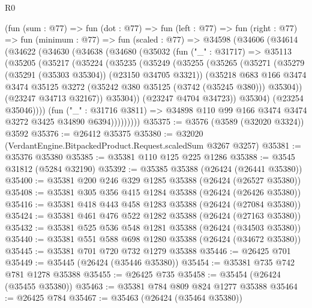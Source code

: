 \begin{lexlean}{R0}
\begin{coremodule}
    (fun (sum : @77) =>
    fun (dot : @77) =>
    fun (left : @77) =>
    fun (right : @77) =>
    fun (minimum : @77) =>
    fun (scaled : @77) =>
    @34598
      (@34606
        (@34614
          (@34622
            (@34630
              (@34638
                (@34680
                  (@35032
                    (fun ("_" : @31717) =>
                    @35113
                      (@35205
                        (@35217
                          (@35224
                            (@35235
                              (@35249
                                (@35255
                                  (@35265
                                    (@35271
                                      (@35279 (@35291 (@35303 @35304)) (@23150 @34705 @3321))
                                      (@35218
                                        @683
                                        @166
                                        @3474
                                        @3474
                                        @35125
                                        @3272
                                        (@35242 @380 @35125 (@3742 (@35245 @380)))
                                        @35304))
                                    (@23247 @34713 @32167))
                                  @35304))
                              (@23247 @4704 @34723))
                            @35304)
                          (@23254 @35046))))
                    (fun ("_" : @31716 @3811) =>
                    @34898 @110 @99 @166 @3474 @3474 @3272 @3425 @34890 @6394)))))))))
@35375 := @3576 (@3589 (@32020 @3324)) @3592
@35376 := @26412 @35375
@35380 := @32020 (VerdantEngine.BitpackedProduct.Request.scaledSum @3267 @3257)
@35381 := @35376 @35380
@35385 := @35381 @110 @125 @225 @1286
@35388 := @3545 @31812 (@5284 @32190)
@35392 := @35385 @35388 (@26424 (@26441 @35380))
@35400 := @35381 @200 @246 @329 @1285 @35388 (@26424 (@26527 @35380))
@35408 := @35381 @305 @356 @415 @1284 @35388 (@26424 (@26426 @35380))
@35416 := @35381 @418 @443 @458 @1283 @35388 (@26424 (@27084 @35380))
@35424 := @35381 @461 @476 @522 @1282 @35388 (@26424 (@27163 @35380))
@35432 := @35381 @525 @536 @548 @1281 @35388 (@26424 (@34503 @35380))
@35440 := @35381 @551 @588 @698 @1280 @35388 (@26424 (@34672 @35380))
@35445 := @35381 @701 @720 @732 @1279 @35388
@35446 := @26425 @701
@35449 := @35445 (@26424 (@35446 @35380))
@35454 := @35381 @735 @742 @781 @1278 @35388
@35455 := @26425 @735
@35458 := @35454 (@26424 (@35455 @35380))
@35463 := @35381 @784 @809 @824 @1277 @35388
@35464 := @26425 @784
@35467 := @35463 (@26424 (@35464 @35380))

\end{coremodule}
\end{lexlean}
